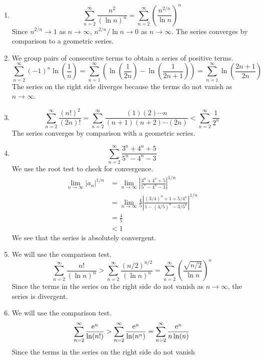 {\begin{Solution}
\begin{enumerate}
\[    \]
    The series converges by comparison to the harmonic series.
  \item
    \[
    \sum_{n=2}^\infty \frac{n^2}{(\ln n)^n}
    = \sum_{n=2}^\infty \left( \frac{n^{2/n}}{\ln n} \right)^n
    \]
    Since $n^{2/n} \to 1$ as $n \to \infty$, $n^{2/n} / \ln n \to 0$ as $n \to \infty$.  The series 
    converges by comparison to a geometric series.
  \item
    We group pairs of consecutive terms to obtain a series of positive terms.
    \[
    \sum_{n=2}^\infty (-1)^n \ln \left( \frac{1}{n} \right)
    = \sum_{n=1}^\infty \left( \ln \left( \frac{1}{2 n} \right) - 
      \ln \left( \frac{1}{2 n + 1} \right) \right)
    = \sum_{n=1}^\infty \ln \left( \frac{2 n + 1}{2 n} \right)
    \]
    The series on the right side diverges because the terms do not vanish 
    as $n \to \infty$.
  \item
    \[
    \sum_{n=2}^\infty \frac{ (n!)^2 }{ (2 n)! }
    = \sum_{n=2}^\infty \frac{ (1) (2) \cdots n }{ (n+1) (n+2) \cdots (2 n) }
    < \sum_{n=2}^\infty \frac{1}{2^n}
    \]
    The series converges by comparison with a geometric series.
  \item
    \[
    \sum_{n=2}^\infty \frac{3^n + 4^n + 5}{5^n - 4^n - 3}
    \]
    We use the root test to check for convergence.
    \begin{align*}
      \lim_{n \to \infty} \left| a_n \right|^{1/n}
      &= \lim_{n \to \infty} \left| \frac{3^n + 4^n + 5}{5^n - 4^n - 3} \right|^{1/n}
      \\
      &= \lim_{n \to \infty} \frac{4}{5} \left| \frac{(3/4)^n + 1 + 5/4^n}
        {1 - (4/5)^n - 3/5^n} \right|^{1/n}
      \\
      &= \frac{4}{5}
      \\
      &< 1
    \end{align*}
    We see that the series is absolutely convergent.
  \item
    We will use the comparison test.
    \[
    \sum_{n=2}^\infty \frac{ n! }{ (\ln n)^n }
    > \sum_{n=2}^\infty \frac{ (n/2)^{n/2} }{ (\ln n)^n }
    = \sum_{n=2}^\infty \left( \frac{ \sqrt{n/2} }{ \ln n } \right)^n
    \]
    Since the terms in the series on the right side do not vanish
    as $n \to \infty$, the series is divergent.
  \item
    We will use the comparison test.
    \[
    \sum_{n=2}^\infty \frac{\mathop{\mathrm{e}}\nolimits^n}{\ln(n!)}
    > \sum_{n=2}^\infty \frac{\mathop{\mathrm{e}}\nolimits^n}{\ln(n^n)}
    = \sum_{n=2}^\infty \frac{\mathop{\mathrm{e}}\nolimits^n}{n \ln(n)}
    \]
    Since the terms in the series on the right side do not vanish

\end{enumerate}
\end{Solution}}
